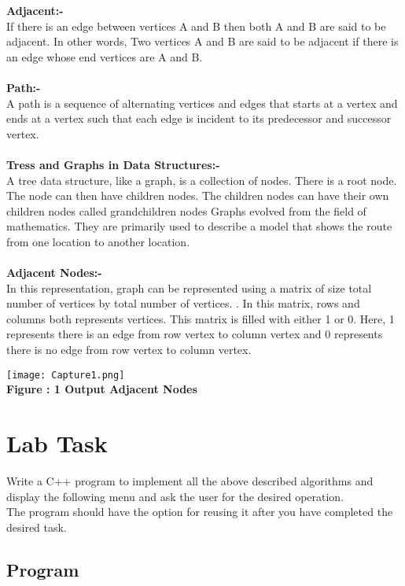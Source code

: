 \documentclass[11pt]{article}            %
\begin{document}
\textbf{Adjacent:-}\\
If there is an edge between vertices A and B then both A and B are said to be adjacent. In other words, Two vertices A and B are said to be adjacent if there is an edge whose end vertices are A and B. \\ \\

\textbf{Path:-}\\
A path is a sequence of alternating vertices and edges that starts at a vertex and ends at a vertex such that each edge is incident to its predecessor and successor vertex. \\ \\

\textbf{Tress and Graphs in Data Structures:-}\\
A tree data structure, like a graph, is a collection of nodes. There is a root node. The node can then have children nodes. The children nodes can have their own children nodes called grandchildren nodes
Graphs evolved from the field of mathematics. They are primarily used to describe a model that shows the route from one location to another location. \\ \\

\textbf{Adjacent Nodes:-}\\
In this representation, graph can be represented using a matrix of size total number of vertices by total number of vertices. . In this matrix, rows and columns both represents vertices. This matrix is filled with either 1 or 0. Here, 1 represents there is an edge from row vertex to column vertex and 0 represents there is no edge from row vertex to column vertex.
\begin{center}
 \texttt{[image: Capture1.png]}\\ 
\textbf{Figure : 1 Output Adjacent Nodes}
\vskip 0.5cm
\end{center}

\section{Lab Task }  
Write a C++ program to implement all the above described algorithms and display the following menu and ask the user for the desired operation.\\    The program should have the option for reusing it after you have completed the desired task.

\subsection{Program}     
\end{document}
